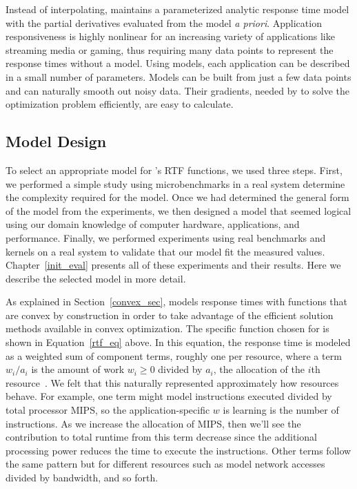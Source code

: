 Instead of interpolating, \pacora maintains a parameterized analytic response time model with the partial derivatives evaluated from the model \emph{a priori}. Application responsiveness is highly nonlinear for an increasing variety of applications like streaming media or gaming, thus requiring many data points to represent the response times without a model. Using models, each application can be described in a small number of parameters.  Models can be built from just a few data points and can naturally smooth out noisy data. Their gradients, needed by \pacora to solve the optimization problem efficiently, are easy to calculate.

\subsection{Model Design}

To select an appropriate model for \pacora's RTF functions, we used three steps.  First, we performed a simple study using microbenchmarks in a real system determine the complexity required for the model. Once we had determined the general form of the model from the experiments, we then designed a model that seemed logical using our domain knowledge of computer hardware, applications, and performance.  Finally, we performed experiments using real benchmarks and kernels on a real system to validate that our model fit the measured values.  Chapter~\ref{init_eval} presents all of these experiments and their results.   Here we describe the selected model in more detail. 

As explained in Section~\ref{convex_sec}, \pacora models response times with functions that are convex by construction in order to take advantage of the efficient solution methods available in convex optimization.
The specific function chosen for \pacora is shown in Equation~\ref{rtf_eq} above.
In this equation, the response time is modeled as a weighted sum of component terms,
roughly one per resource, where a term $w_i/a_i$ is the amount of work $w_i \geq 0$ divided by $a_i$, the allocation of the $i$th resource~\cite{Snav}.  We felt that this naturally represented approximately how resources behave. For example, one term might model instructions executed divided by total processor MIPS, so the application-specific $w$ \pacora is learning is the number of instructions.  As we increase the allocation of MIPS, then we'll see the contribution to total runtime from this term decrease since the additional processing power reduces the time to execute the instructions.  Other terms follow the same pattern but for different resources such as model network accesses divided by bandwidth, and so forth.

